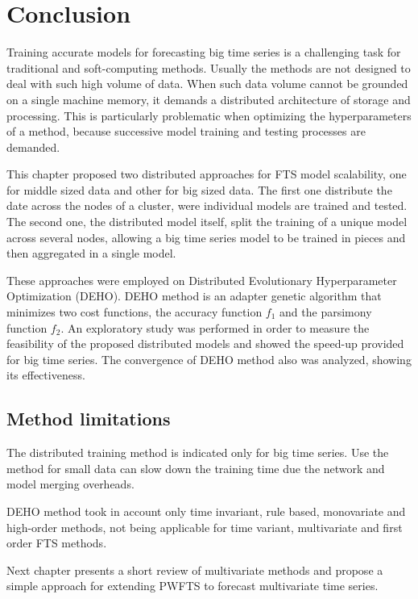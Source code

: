 \section{Conclusion}
\label{sec:scalability_conclusion}

Training accurate models for forecasting big time series is a challenging task for traditional and soft-computing methods. Usually the methods are not designed to deal with such high volume of data. When such data volume cannot be grounded on a single machine memory, it demands a distributed architecture of storage and processing. This is particularly problematic when optimizing the hyperparameters of a method, because successive model training and testing processes are demanded. 

This chapter proposed two distributed approaches for FTS model scalability, one for middle sized data and other for big sized data. The first one distribute the date across the nodes of a cluster, were individual models are trained and tested. The second one, the distributed model itself, split the training of a unique model across several nodes, allowing a big time series model to be trained in pieces and then aggregated in a single model.

These approaches were employed on Distributed Evolutionary Hyperparameter Optimization (DEHO). DEHO method is an adapter genetic algorithm that minimizes two cost functions, the accuracy function $f_1$ and the parsimony function $f_2$. An exploratory study was performed in order to measure the feasibility of the proposed distributed models and showed the speed-up provided for big time series. The convergence of DEHO method also was analyzed, showing its effectiveness.

\subsection{Method limitations}

The distributed training method is indicated only for big time series. Use the method for small data can slow down the training time due the network and model merging overheads. 

DEHO method took in account only time invariant, rule based, monovariate and high-order methods, not being applicable for time variant, multivariate and first order FTS methods.  

Next chapter presents a short review of multivariate methods and propose a simple approach for extending PWFTS to forecast multivariate time series.

